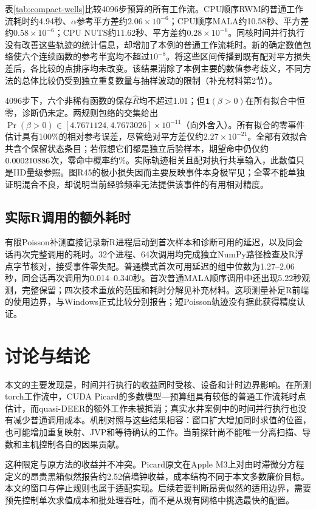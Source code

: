 \documentclass[UTF8,fontset=fandol,zihao=-4]{ctexart}
\newcommand{\ind}{\mathbf{1}}
\begin{document}
表\ref{tab:compact-wells}比较4096步预算的所有工作流。CPU顺序RWM的普通工作流耗时约4.94秒、$\alpha$参考平方差约$2.06\times10^{-6}$；CPU顺序MALA约10.58秒、平方差约$0.58\times10^{-6}$；CPU NUTS约11.62秒、平方差约$0.28\times10^{-6}$。同核时间并行执行没有改善这些轨迹的统计信息，却增加了本例的普通工作流耗时。新的确定数值包络使六个连续函数的参考半宽均不超过$10^{-8}$。将这些区间传播到既有配对平方损失差后，各比较的点排序均未改变。该结果消除了本例主要的数值参考歧义，不同方法的总体比较仍受到独立重复数量与抽样波动的限制（补充材料第2节）。



4096步下，六个非稀有函数的保存$\hat R$均不超过1.01；但$\ind(\beta>0)$在所有拟合中恒零，诊断仍未定。两规则包络的交集给出$\Pr(\beta>0)\in[4.7671124,4.7673026]\times10^{-11}$（向外舍入）。所有拟合的零事件估计具有100\%的相对参考误差，尽管绝对平方差仅约$2.27\times10^{-21}$。全部有效拟合共含\PBIIDWOneStates{}个保留状态条目；若假想它们都是独立后验样本，期望命中仍仅约$0.000210886$次，零命中概率约\PBIIDWOneZero\%。实际轨迹相关且配对执行共享输入，此数值只是IID量级参照。图R45的极小损失因而主要反映事件本身极罕见；全零不能单独证明混合不良，却说明当前经验频率无法提供该事件的有用相对精度。

\subsection{实际R调用的额外耗时}
有限Poisson补测直接记录新R进程启动到首次样本和诊断可用的延迟，以及同会话再次完整调用的耗时。32个进程、64次调用均完成独立NumPy路径检查及R浮点字节核对，接受事件零失配。普通模式首次可用延迟的组中位数为1.27--2.06秒，同会话再次调用为0.014--0.340秒。首次普通MALA顺序调用中还出现5.22秒观测，完整保留；四次技术重放的范围和耗时分解见补充材料。这项测量补足R前端的使用边界，与Windows正式比较分别报告；短Poisson轨迹没有据此获得精度认证。

\section{讨论与结论}
本文的主要发现是，时间并行执行的收益同时受核、设备和计时边界影响。在所测torch工作流中，CUDA Picard的多数模型—预算组具有较低的普通工作流耗时点估计，而quasi-DEER的额外工作未被抵消；真实水井案例中的时间并行执行也没有减少普通调用成本。机制对照与这些结果相容：窗口扩大增加同时求值的位置，也可能增加重复映射、JVP和等待确认的工作。当前探针尚不能唯一分离扫描、导数和主机控制各自的因果贡献。

这种限定与原方法的收益并不冲突。Picard原文在Apple M3上对由时滞微分方程定义的昂贵黑箱似然报告约2.52倍墙钟收益\cite{grazzi}，成本结构不同于本文多数廉价目标。本文的窗口与停止规则也属于适配实现。后续若要判断昂贵似然的适用边界，需要预先控制单次求值成本和批处理吞吐，而不是从现有网格中挑选最快的配置。
\end{document}
